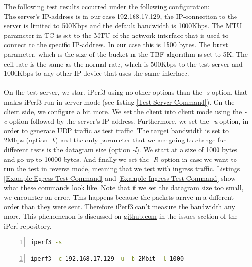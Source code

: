 The following test results occurred under the following configuration:
\\
The server's \acs{IP}-address is in our case 192.168.17.129, the \acs{IP}-connection to the server is limited to 500Kbps and the default bandwidth is 1000Kbps. The \ac{MTU} parameter in \acs{TC} is set to the \acs{MTU} of the network interface that is used to connect to the specific \acs{IP}-address. In our case this is 1500 bytes. The burst parameter, which is the size of the bucket in the \acs{TBF} algorithm is set to 5K. The ceil rate is the same as the normal rate, which is 500Kbps to the test server and 1000Kbps to any other \acs{IP}-device that uses the same interface.
\\
\\
On the test server, we start iPerf3 using no other options than the \textit{-s} option, that makes iPerf3 run in server mode (see listing \ref{Test Server Command}). On the client side, we configure a bit more. We set the client into client mode using the \textit{-c} option followed by the server's \acs{IP}-address. Furthermore, we set the \textit{-u} option, in order to generate \acs{UDP} traffic as test traffic. The target bandwidth is set to 2Mbps (option \textit{-b}) and the only parameter that we are going to change for different tests is the datagram size (option \textit{-l}). We start at a size of 1000 bytes and go up to 10000 bytes. And finally we set the \textit{-R} option in case we want to run the test in reverse mode, meaning that we test with ingress traffic. Listings \ref{Example Egress Test Command} and \ref{Example Ingress Test Command} show what these commands look like. Note that if we set the datagram size too small, we encounter an error. This happens because the packets arrive in a different order than they were sent. Therefore iPerf3 can't measure the bandwidth any more. This phenomenon is discussed on \href{https://github.com/esnet/iperf/issues/457}{github.com}\cite{mah2016iperfIssue} in the issues section of the iPerf repository.

\newpage

\begin{lstlisting}[language=sh, caption = Test Server Command, captionpos=b, numbers=left, frame=single, breaklines=true, breakatwhitespace=true, showstringspaces=false, label=Test Server Command]
iperf3 -s
\end{lstlisting}

\begin{lstlisting}[language=sh, caption = Example Egress Test Command, captionpos=b, numbers=left, frame=single, breaklines=true, breakatwhitespace=true, showstringspaces=false, label=Example Egress Test Command]
iperf3 -c 192.168.17.129 -u -b 2Mbit -l 1000
\end{lstlisting}

